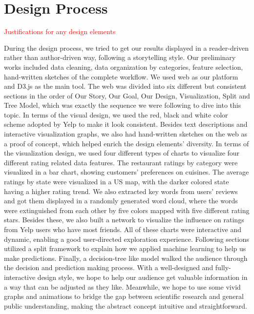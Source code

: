 \section{Design Process}
\label{sec:design} 

\textcolor{red}{Justifications for any design elements}

During the design process, we tried to get our results displayed in a reader-driven rather than author-driven way, following a storytelling style. Our preliminary works included data cleaning, data organization by categories, feature selection, hand-written sketches of the complete workflow. We used web as our platform and D3.js as the main tool. The web was divided into six different but consistent sections in the order of Our Story, Our Goal, Our Design, Visualization, Split and Tree Model, which was exactly the sequence we were following to dive into this topic. In terms of the visual design, we used the red, black and white color scheme adopted by Yelp to make it look consistent. Besides text descriptions and interactive visualization graphs, we also had hand-written sketches on the web as a proof of concept, which helped enrich the design elements' diversity. In terms of the visualization design, we used four different types of charts to visualize four different rating related data features. The restaurant ratings by category were visualized in a bar chart, showing customers' preferences on cuisines. The average ratings by state were visualized in a US map, with the darker colored state having a higher rating trend. We also extracted key words from users' reviews and got them displayed in a randomly generated word cloud, where the words were extinguished from each other by five colors mapped with five different rating stars. Besides these, we also built a network to visualize the influence on ratings from Yelp users who have most friends. All of these charts were interactive and dynamic, enabling a good user-directed exploration experience. Following sections utilized a split framework to explain how we applied machine learning to help us make predictions. Finally, a decision-tree like model walked the audience through the decision and prediction making process. With a well-designed and fully-interactive design style, we hope to help our audience get valuable information in a way that can be adjusted as they like. Meanwhile, we hope to use some vivid graphs and animations to bridge the gap between scientific research and general public understanding, making the abstract concept intuitive and straightforward.
